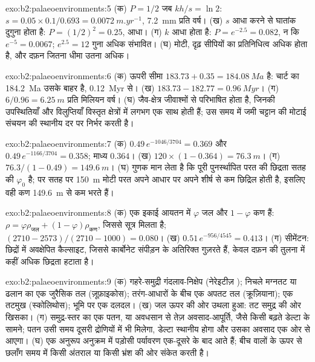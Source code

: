 \begin{solution}{exo:b2:palaeoenvironments:5}
(क) $P = 1/2$ जब $kh/s = \ln 2$: $s = 0.05 \times 0.1/0.693 = \qty{0.0072}{m.yr^{-1}}$,
\qty{7.2}{mm} प्रति वर्ष। (ख) $s$ आधा करने से घातांक दुगुना होता है: $P = (1/2)^2 = 0.25$, आधा।
(ग) $k$ आधा होता है: $P = e^{-2.5} = 0.082$, न कि $e^{-5} = 0.0067$; $e^{2.5} = 12$ गुना अधिक
संभावित। (घ) मोटी, दृढ़ सीपियों का प्रतिनिधित्व अधिक होता है, और दफ़न जितना धीमा उतना अधिक।
\end{solution}

\begin{solution}{exo:b2:palaeoenvironments:6}
(क) ऊपरी सीमा $183.73 + 0.35 = \qty{184.08}{Ma}$ है: चार्ट का \qty{184.2}{Ma} उसके
बाहर है, \qty{0.12}{Myr} से। (ख) $183.73 - 182.77 = \qty{0.96}{Myr}$। (ग) $6/0.96 =
\qty{6.25}{m}$ प्रति मिलियन वर्ष। (घ) जैव-क्षेत्र जीवाश्मों से परिभाषित होता है, जिनकी उपस्थितियाँ और
विलुप्तियाँ विस्तृत क्षेत्रों में लगभग एक साथ होती हैं; उस समय में जमी चट्टान की मोटाई
संचयन की स्थानीय दर पर निर्भर करती है।
\end{solution}

\begin{solution}{exo:b2:palaeoenvironments:7}
(क) $0.49\,e^{-1046/3704} = 0.369$ और $0.49\,e^{-1166/3704} = 0.358$; माध्य $0.364$। (ख) $120
\times (1 - 0.364) = \qty{76.3}{m}$। (ग) $76.3/(1 - 0.49) = \qty{149.6}{m}$। (घ) गुणक
मान लेता है कि पूरी पुनर्स्थापित परत की छिद्रता सतह की $\varphi_0$ है; पर सतह पर
\qty{150}{m} मोटी परत अपने आधार पर अपने शीर्ष से कम छिद्रिल होती है, इसलिए वही कण
\qty{149.6}{m} से कम भरते हैं।
\end{solution}

\begin{solution}{exo:b2:palaeoenvironments:8}
(क) एक इकाई आयतन में $\varphi$ जल और $1 - \varphi$ कण हैं: $\rho = \varphi
\rho_{\text{जल}} + (1 - \varphi)\rho_{\text{कण}}$, जिससे सूत्र मिलता है; $(2710 -
2573)/(2710 - 1000) = 0.080$। (ख) $0.51\,e^{-956/4545} = 0.413$। (ग) सीमेंटन: छिद्रों में
अवक्षेपित कैल्साइट, जिससे कार्बोनेट संपीड़न के अतिरिक्त गुज़रते हैं, केवल दफ़न की तुलना में कहीं अधिक
छिद्रता हटाता है।
\end{solution}

\begin{solution}{exo:b2:palaeoenvironments:9}
(क) गहरे-समुद्री गंदलाव-निक्षेप (नेरेइटीज़ ); निचले मग्नतट या ढलान का एक जुरैसिक तल
(ज़ूफ़ाइकोस); तरंग-आधारों के बीच एक अपतट तल (क्रूज़ियाना); एक तटमुख (स्कोलिथोस); भूमि पर एक
दलदल। (ख) जल ऊपर की ओर उथला हुआ: तट समुद्र की ओर खिसका। (ग) समुद्र-स्तर का एक पतन,
या अवधसान से तेज़ अवसाद-आपूर्ति, जैसे किसी बढ़ते डेल्टा के सामने; पतन
उसी समय दूसरी द्रोणियों में भी मिलेगा, डेल्टा स्थानीय होगा और उसका अवसाद एक ओर से
आएगा। (घ) एक अनुरूप अनुक्रम में पड़ोसी पर्यावरण एक-दूसरे के बाद आते हैं; बीच वालों
के ऊपर से छलाँग समय में किसी अंतराल या किसी भ्रंश की ओर संकेत करती है।
\end{solution}

